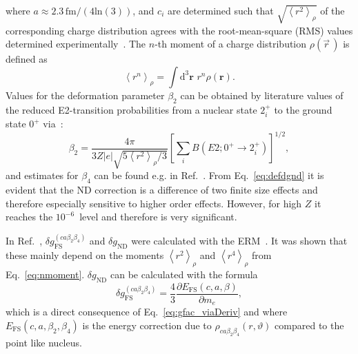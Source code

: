 where $a\approx 2.3\,\text{fm}/(4\text{ln}(3))$, and $c_i$ are determined such that $\sqrt{\left<r^2\right>_{\rho}}$ of the corresponding charge distribution agrees with the root-mean-square (RMS) values determined experimentally~\cite{Angeli2013}. The $n$-th moment of a charge distribution $\rho(\vec{r}\,)$ is defined as
\begin{equation}
\left< r^n \right>_{\rho} = \int \text{d}^3\mathbf{r}\,\, r^n \rho(\mathbf{r}).
\label{eq:nmoment}
\end{equation}
Values for the deformation parameter $\beta_2$ can be obtained by literature values of the reduced E2-transition probabilities from a nuclear state $2^+_i$ to the ground state $0^+$ via~\cite{Trager}:
\begin{equation}
\beta_2 = \frac{4\pi}{3Z|e|\sqrt{5\left< r^2\right>_{\rho} /3}}\left[ \sum_i B(E2;0^+\rightarrow 2_i^+) \right]^{1/2},
\label{eq:beta}
\end{equation}
and estimates for $\beta_4$ can be found e.g. in Ref.~\cite{Moller1995}.
From Eq.~\eqref{eq:defdgnd} it is evident that the ND correction is a difference of two finite size effects and therefore especially sensitive to higher order effects. However, for high $Z$ it reaches the $10^{-6}$~level and therefore is very significant.

In Ref.~\cite{jacek2012}, $\delta g_{\text{FS}}^{(ca\beta_2\beta_4)}$ and $\delta g_{\text{ND}}$ were calculated with the ERM~\cite{Shabaev1993}. It was shown that these mainly depend on the moments $\left< r^2 \right>_{\rho}$ and $\left< r^4 \right>_{\rho}$ from Eq.~\eqref{eq:nmoment}.
$\delta g_{\text{ND}}$ can be calculated with the formula~\cite{Karshenboim2005}
\begin{equation}
\delta g^{(ca\beta_2\beta_4)}_{\text{FS}}=\frac{4}{3}\frac{\partial E_{\text{FS}}(c,a,\beta)}{\partial m_e},
\label{eq:effrad}
\end{equation}
which is a direct consequence of Eq.~\eqref{eq:gfac_viaDeriv} and where $E_{\text{FS}}(c,a,\beta_2,\beta_4)$ is the energy correction due to $\rho_{ca\beta_2\beta_4}(r,\vartheta)$ compared to the point like nucleus.

